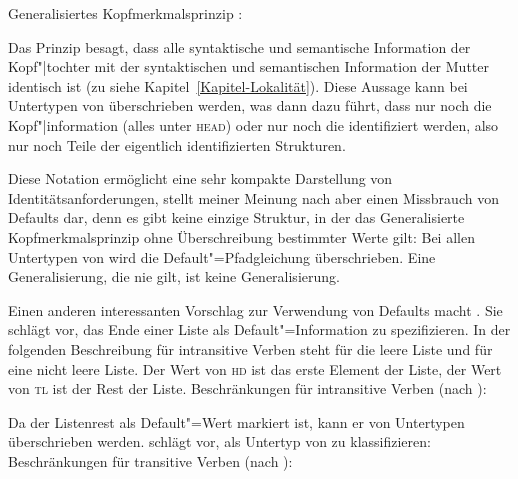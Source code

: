 \ea
Generalisiertes Kopfmerkmalsprinzip \citep[]{GSag2000a-u}:\\[2pt]
 \impl
{}
\z


\noindent
Das Prinzip besagt, dass alle syntaktische und semantische Information der Kopf"|tochter
mit der syntaktischen und semantischen Information der Mutter identisch ist (zu \synsem
siehe Kapitel~\ref{Kapitel-Lokalität}). Diese Aussage kann bei Untertypen von  überschrieben werden,
was dann dazu führt, dass \zb nur noch die Kopf"|information (alles unter \textsc{head}) oder nur
noch die \compswe identifiziert werden, also nur noch Teile der eigentlich identifizierten
Strukturen.

Diese Notation ermöglicht eine sehr kompakte Darstellung von Identitätsanforderungen, stellt
meiner Meinung nach aber einen Missbrauch von Defaults dar, denn es gibt keine einzige Struktur,
in der das Generalisierte Kopfmerkmalsprinzip ohne Überschreibung bestimmter Werte gilt: Bei allen Untertypen von 
wird die Default"=Pfadgleichung überschrieben. Eine Generalisierung, die nie gilt, ist keine Generalisierung.


Einen anderen interessanten Vorschlag zur Verwendung von Defaults macht \citet[--87]{Villavicencio2000a-u}.
Sie schlägt vor, das Ende einer Liste als Default"=Information zu spezifizieren. In der folgenden Beschreibung
für intransitive Verben steht  für die leere Liste und
 für eine nicht leere Liste. 
Der Wert von \textsc{hd} ist das erste Element der Liste, der Wert von \textsc{tl} ist der Rest der Liste.
\eas
Beschränkungen für intransitive Verben (nach \citealt{Villavicencio2000a-u}):\\
  \impl
{}
\zs

\noindent
Da der Listenrest als Default"=Wert markiert ist, kann er von Untertypen überschrieben werden.
\citet[--87]{Villavicencio2000a-u} schlägt vor,  als Untertyp
von  zu klassifizieren:
\eas
Beschränkungen für transitive Verben (nach \citealt{Villavicencio2000a-u}):\\
 \impl 
{}
\zs

